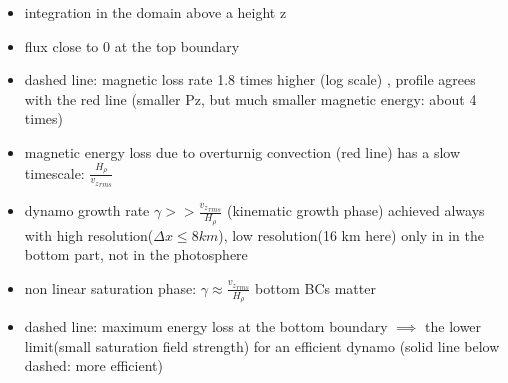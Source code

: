 \documentclass{beamer}
\begin{document}
\begin{frame}

\begin{itemize}
\item integration in the domain above a height z
\item flux close to 0 at the top boundary
\item dashed line: magnetic loss  rate 1.8 times higher (log scale) , profile  agrees with the red line (smaller Pz, but much smaller magnetic energy: about 4 times)
\item magnetic energy loss due to overturnig convection (red line) has a slow timescale: $\frac{H_{\rho}}{{v_z}_{rms}}$
\item dynamo growth rate $\gamma >> \frac{{v_z}_{rms}}{H_{\rho}}$ (kinematic growth phase) achieved always with high resolution($\Delta x \le 8km$), low resolution(16 km here) only in in the bottom part,
not in the photosphere
\item non linear saturation phase:  $\gamma \approx \frac{{v_z}_{rms}}{H_{\rho}}$ bottom BCs matter
\item dashed line: maximum energy loss at the bottom boundary $\implies$ the lower limit(small saturation field strength)  for an efficient dynamo (solid line below dashed: more efficient) 
\end{itemize}

\end{frame}
\end{document}
